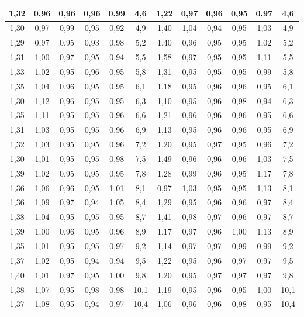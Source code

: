 \begin{table}[H]
\begin{center}
{\begin{tabular}{| c | c | c | c | c | c | c | c | c | c | c | c |}
\hline
1,32 &	0,96 &	0,96 &	0,96 &	0,99 &	4,6 & 1,22 & 0,97 & 0,96 & 0,95 & 0,97 & 4,6\\
\hline
1,30 &	0,97 &	0,99 &	0,95 &	0,92 &	4,9 & 1,40 & 1,04 & 0,94 & 0,95 & 1,03 & 4,9\\
\hline
1,29 &	0,97 &	0,95 &	0,93 &	0,98 &	5,2 & 1,40 & 0,96 & 0,95 & 0,95 & 1,02 & 5,2\\
\hline
1,31 &	1,00 &	0,97 &	0,95 &	0,94 &	5,5 & 1,58 & 0,97 & 0,95 & 0,95 & 1,11 & 5,5\\
\hline
1,33 &	1,02 &	0,95 &	0,96 &	0,95 &	5,8 & 1,31 & 0,95 & 0,95 & 0,95 & 0,99 & 5,8\\
\hline
1,35 &	1,04 &	0,96 &	0,95 &	0,95 &	6,1 & 1,18 & 0,95 & 0,96 & 0,96 & 0,95 & 6,1\\
\hline
1,30 &	1,12 &	0,96 &	0,95 &	0,95 &	6,3 & 1,10 & 0,95 & 0,96 & 0,98 & 0,94 & 6,3\\
\hline
1,35 &	1,11 &	0,95 &	0,95 &	0,96 &	6,6 & 1,21 & 0,96 & 0,96 & 0,96 & 0,95 & 6,6\\
\hline
1,31 &	1,03 &	0,95 &	0,95 &	0,96 &	6,9 & 1,13 & 0,95 & 0,96 & 0,96 & 0,95 & 6,9\\
\hline
1,32 &	1,03 &	0,95 &	0,95 &	0,96 &	7,2 & 1,20 & 0,95 & 0,97 & 0,95 & 0,96 & 7,2\\
\hline
1,30 &	1,01 &	0,95 &	0,95 &	0,98 &	7,5 & 1,49 & 0,96 & 0,96 & 0,96 & 1,03 & 7,5\\
\hline
1,39 &	1,02 &	0,95 &	0,95 &	0,95 &	7,8 & 1,28 & 0,99 & 0,96 & 0,95 & 1,17 & 7,8\\
\hline
1,36 &	1,06 &	0,96 &	0,95 &	1,01 &	8,1 & 0,97 & 1,03 & 0,95 & 0,95 & 1,13 & 8,1\\
\hline
1,36 &	1,09 &	0,97 &	0,94 &	1,05 &	8,4 & 1,29 & 0,95 & 0,96 & 0,96 & 0,97 & 8,4\\
\hline
1,38 &	1,04 &	0,95 &	0,95 &	0,95 &	8,7 & 1,41 & 0,98 & 0,97 & 0,96 & 0,97 & 8,7\\
\hline
1,39 &	1,00 &	0,96 &	0,95 &	0,96 &	8,9 & 1,17 & 0,97 & 0,96 & 1,00 & 1,13 & 8,9\\
\hline
1,35 &	1,01 &	0,95 &	0,95 &	0,97 &	9,2 & 1,14 & 0,97 & 0,97 & 0,99 & 0,99 & 9,2\\
\hline
1,37 &	1,02 &	0,95 &	0,94 &	0,94 &	9,5 & 1,22 & 0,95 & 0,96 & 0,97 & 0,97 & 9,5\\
\hline
1,40 &	1,01 &	0,97 &	0,95 &	1,00 &	9,8 & 1,20 & 0,95 & 0,97 & 0,97 & 0,97 & 9,8\\
\hline
1,38 &	1,07 &	0,95 &	0,98 &	0,98 &	10,1 & 1,19 & 0,95 & 0,96 & 0,95 & 1,00 & 10,1\\
\hline
1,37 &	1,08 &	0,95 &	0,94 &	0,97 &	10,4 & 1,06 & 0,96 & 0,96 & 0,98 & 0,95 & 10,4\\

\end{tabular}}
\end{center}
\end{table}
